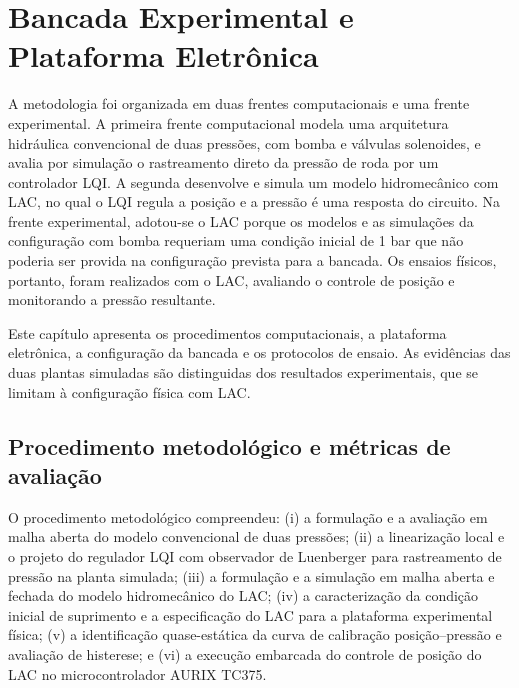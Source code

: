 \chapter{Bancada Experimental e Plataforma Eletrônica}
\label{chap:metodologia}
A metodologia foi organizada em duas frentes computacionais e uma frente experimental. A primeira frente computacional modela uma arquitetura hidráulica convencional de duas pressões, com bomba e válvulas solenoides, e avalia por simulação o rastreamento direto da pressão de roda por um controlador \gls{LQI}. A segunda desenvolve e simula um modelo hidromecânico com \gls{LAC}, no qual o \gls{LQI} regula a posição e a pressão é uma resposta do circuito. Na frente experimental, adotou-se o \gls{LAC} porque os modelos e as simulações da configuração com bomba requeriam uma condição inicial de 1 bar que não poderia ser provida na configuração prevista para a bancada. Os ensaios físicos, portanto, foram realizados com o \gls{LAC}, avaliando o controle de posição e monitorando a pressão resultante.

Este capítulo apresenta os procedimentos computacionais, a plataforma eletrônica, a configuração da bancada e os protocolos de ensaio. As evidências das duas plantas simuladas são distinguidas dos resultados experimentais, que se limitam à configuração física com \gls{LAC}.

\section{Procedimento metodológico e métricas de avaliação}
\label{sec:metodologia-procedimento}

O procedimento metodológico compreendeu: (i) a formulação e a avaliação em malha aberta do modelo convencional de duas pressões; (ii) a linearização local e o projeto do regulador LQI com observador de Luenberger para rastreamento de pressão na planta simulada; (iii) a formulação e a simulação em malha aberta e fechada do modelo hidromecânico do LAC; (iv) a caracterização da condição inicial de suprimento e a especificação do LAC para a plataforma experimental física; (v) a identificação quase-estática da curva de calibração posição--pressão e avaliação de histerese; e (vi) a execução embarcada do controle de posição do \gls{LAC} no microcontrolador AURIX TC375.

